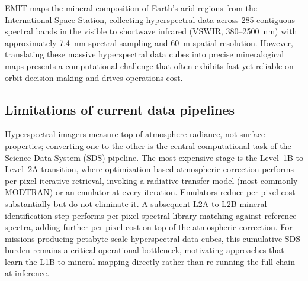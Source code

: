 \documentclass[preprint,12pt]{elsarticle}
\begin{document}
EMIT maps the mineral composition of Earth's arid regions from the International Space Station, collecting hyperspectral data across 285 contiguous spectral bands in the visible to shortwave infrared (VSWIR, 380--2500~nm) with approximately 7.4~nm spectral sampling and 60~m spatial resolution. 
However, translating these massive hyperspectral data cubes into precise mineralogical maps presents a computational challenge that often exhibits fast yet reliable on-orbit decision-making and drives operations cost.

\subsection{Limitations of current data pipelines}
\label{subsec:limitations_pipelines}

Hyperspectral imagers measure top-of-atmosphere radiance, not surface properties; 
converting one to the other is the central computational task of the Science Data System (SDS) pipeline. 
The most expensive stage is the Level~1B to Level~2A transition, where 
optimization-based atmospheric correction performs per-pixel iterative 
retrieval, invoking a radiative transfer model (most commonly MODTRAN) 
or an emulator at every iteration. Emulators reduce per-pixel cost 
substantially but do not eliminate it. A subsequent L2A-to-L2B 
mineral-identification step performs per-pixel spectral-library 
matching against reference spectra, adding further per-pixel cost on top of the atmospheric correction. 
For missions producing petabyte-scale hyperspectral data cubes, this cumulative 
SDS burden remains a critical operational bottleneck, motivating 
approaches that learn the L1B-to-mineral mapping directly rather than 
re-running the full chain at inference.
\end{document}
